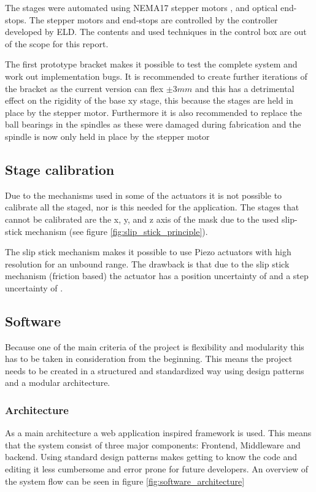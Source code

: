 \documentclass[10pt]{article}
\begin{document}
The stages were automated using NEMA17 stepper motors , and optical end-stops.
The stepper motors and end-stops are controlled by the controller developed by ELD.
The contents and used techniques in the control box are out of the scope for this report.

The first prototype bracket makes it possible to test the complete system and work out implementation bugs. 
It is recommended to create further iterations of the bracket as the current version can flex $\pm 3mm$ and this has a detrimental effect on the rigidity of the base xy stage, this because the stages are held in place by the stepper motor. 
Furthermore it is also recommended to replace the ball bearings in the spindles as these were damaged during fabrication and the spindle is now only held in place by the stepper motor

\subsection{Stage calibration}
Due to the mechanisms used in some of the actuators it is not possible to calibrate all the staged,
nor is this needed for the application. 
The stages that cannot be calibrated are the x, y, and z axis of the mask due to the used slip-stick mechanism (see figure \ref{fig:slip_stick_principle}). 

The slip stick mechanism makes it possible to use Piezo actuators with high resolution for an unbound range.
The drawback is that due to the slip stick mechanism (friction based) the actuator has a position uncertainty of  and a step uncertainty of .

\subsection{Software}
Because one of the main criteria of the project is flexibility and modularity this has to be taken in consideration from the beginning. 
This means the project needs to be created in a structured and standardized way using design patterns and a modular architecture.

\subsubsection{Architecture}
As a main architecture a web application inspired framework is used. 
This means that the system consist of three major components: Frontend, Middleware and backend. 
Using standard design patterns makes getting to know the code and editing it less cumbersome and error prone for future developers.
An overview of the system flow can be seen in figure \ref{fig:software_architecture}
\end{document}
